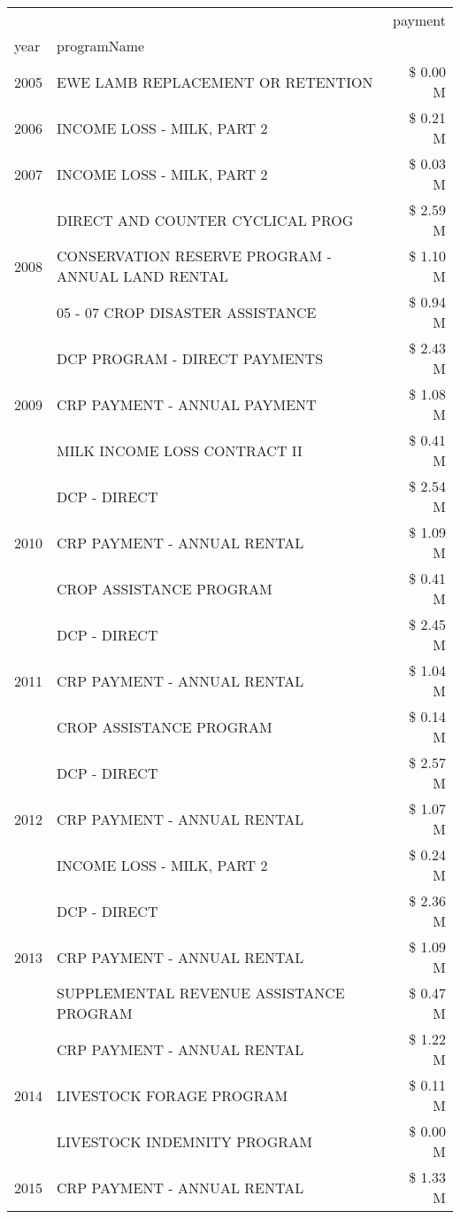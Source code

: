 \begin{tabular}{llr}
\toprule
 &  & payment \\
year & programName &  \\
\midrule
2005 & EWE LAMB REPLACEMENT OR RETENTION & \$ 0.00 M \\
\cline{1-3}
2006 & INCOME LOSS - MILK, PART 2 & \$ 0.21 M \\
\cline{1-3}
2007 & INCOME LOSS - MILK, PART 2 & \$ 0.03 M \\
\cline{1-3}
\multirow[t]{3}{*}{2008} & DIRECT AND COUNTER CYCLICAL PROG & \$ 2.59 M \\
 & CONSERVATION RESERVE PROGRAM - ANNUAL LAND RENTAL & \$ 1.10 M \\
 & 05 - 07 CROP DISASTER ASSISTANCE & \$ 0.94 M \\
\cline{1-3}
\multirow[t]{3}{*}{2009} & DCP PROGRAM - DIRECT PAYMENTS & \$ 2.43 M \\
 & CRP PAYMENT - ANNUAL PAYMENT & \$ 1.08 M \\
 & MILK INCOME LOSS CONTRACT II & \$ 0.41 M \\
\cline{1-3}
\multirow[t]{3}{*}{2010} & DCP - DIRECT & \$ 2.54 M \\
 & CRP PAYMENT - ANNUAL RENTAL & \$ 1.09 M \\
 & CROP ASSISTANCE PROGRAM & \$ 0.41 M \\
\cline{1-3}
\multirow[t]{3}{*}{2011} & DCP - DIRECT & \$ 2.45 M \\
 & CRP PAYMENT - ANNUAL RENTAL & \$ 1.04 M \\
 & CROP ASSISTANCE PROGRAM & \$ 0.14 M \\
\cline{1-3}
\multirow[t]{3}{*}{2012} & DCP - DIRECT & \$ 2.57 M \\
 & CRP PAYMENT - ANNUAL RENTAL & \$ 1.07 M \\
 & INCOME LOSS - MILK, PART 2 & \$ 0.24 M \\
\cline{1-3}
\multirow[t]{3}{*}{2013} & DCP - DIRECT & \$ 2.36 M \\
 & CRP PAYMENT - ANNUAL RENTAL & \$ 1.09 M \\
 & SUPPLEMENTAL REVENUE ASSISTANCE PROGRAM & \$ 0.47 M \\
\cline{1-3}
\multirow[t]{3}{*}{2014} & CRP PAYMENT - ANNUAL RENTAL & \$ 1.22 M \\
 & LIVESTOCK FORAGE PROGRAM & \$ 0.11 M \\
 & LIVESTOCK INDEMNITY PROGRAM & \$ 0.00 M \\
\cline{1-3}
\multirow[t]{3}{*}{2015} & CRP PAYMENT - ANNUAL RENTAL & \$ 1.33 M \\

\end{tabular}
